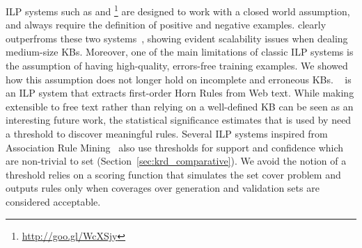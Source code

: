 
ILP systems such as  and \footnote{\url{http://goo.gl/WcXSjy}} are designed to work with a closed world assumption, 
and always require the definition of positive and negative examples. \amie clearly outperfroms these two systems~\cite{galarraga2015fast}, showing evident scalability issues 
when dealing medium-size KBs. Moreover, one of the main limitations of classic ILP systems is the assumption of having high-quality, errors-free training examples. 
We showed how this assumption does not longer hold on incomplete and erroneous KBs. ~\cite{schoenmackers2010learning} is an ILP system that extracts first-order Horn Rules 
from Web text. While making \krd extensible to free text rather than relying on a well-defined KB can be seen as an interesting future work, 
the statistical significance estimates that is used by 
 need a threshold to discover meaningful rules. Several ILP systems inspired from Association Rule Mining~\cite{agrawal1993mining} also use thresholds for 
support and confidence which are non-trivial to set (Section~\ref{sec:krd_comparative}). We avoid the notion of a threshold \krd relies on a scoring function that simulates the set cover problem and outputs rules only when coverages over generation and validation sets are considered acceptable.


